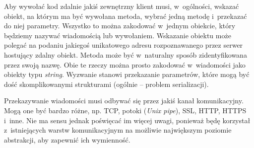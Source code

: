 Aby wywołać kod zdalnie jakiś zewnętrzny klient musi, w~ogólności, wskazać obiekt, na którym ma być wywołana metoda, wybrać jedną metodę i~przekazać do niej parametry. Wszystko to można zakodować w~jednym obiekcie, który będziemy nazywać wiadomością lub wywołaniem.
Wskazanie obiektu może polegać na podaniu jakiegoś unikatowego adresu rozpoznawanego przez serwer hostujący zdalny obiekt.
Metoda może być w~naturalny sposób zidentyfikowana przez swoją nazwę.
Obie te rzeczy można prosto zakodować w~wiadomości jako obiekty typu \emph{string}.
Wyzwanie stanowi przekazanie parametrów, które mogą być dość skomplikowanymi strukturami (ogólnie -- problem serializacji).

Przekazywanie wiadomości musi odbywać się przez jakiś kanał komunikacyjny. Mogą one być bardzo różne, np. TCP, potoki (\emph{Unix pipe}), SSL, HTTP, HTTPS i~inne.
Nie ma sensu jednak poświęcać im więcej uwagi, ponieważ będę korzystał z~istniejących warstw komunikacyjnym na możliwie największym poziomie abstrakcji, aby zapewnić ich wymienność.

%
%
%
%

%
%
%
%

